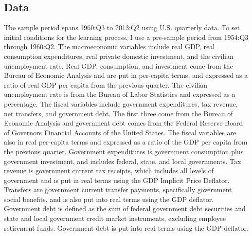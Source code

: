 \documentclass[11pt]{article}
\begin{document}
\subsection{Data}
The sample period spans 1960:Q3 to 2013:Q2 using U.S. quarterly data.  To set initial conditions for the learning process, I use a pre-sample period from 1954:Q3 through 1960:Q2.  The macroeconomic variables include real GDP, real consumption expenditures, real private domestic investment, and the civilian unemployment rate.  Real GDP, consumption, and investment come from the Bureau of Economic Analysis and are put in per-capita terms, and expressed as a ratio of real GDP per capita from the previous quarter.  The civilian unemployment rate is from the Bureau of Labor Statistics and expressed as a percentage.  The fiscal variables include government expenditures, tax revenue, net transfers, and government debt.  The first three come from the Bureau of Economic Analysis and government debt comes from the Federal Reserve Board of Governors Financial Accounts of the United States.  The fiscal variables are also in real per-capita terms and expressed as a ratio of the GDP per capita from the previous quarter.  Government expenditures is government consumption plus government investment, and includes federal, state, and local governments.  Tax revenue is government current tax receipts, which includes all levels of government and is put in real terms using the GDP Implicit Price Deflator.  Transfers are government current transfer payments, specifically government social benefits, and is also put into real terms using the GDP deflator.  Government debt is defined as the sum of federal government debt securities and state and local government credit market instruments, excluding employee retirement funds.  Government debt is put into real terms using the GDP deflator.
\end{document}
